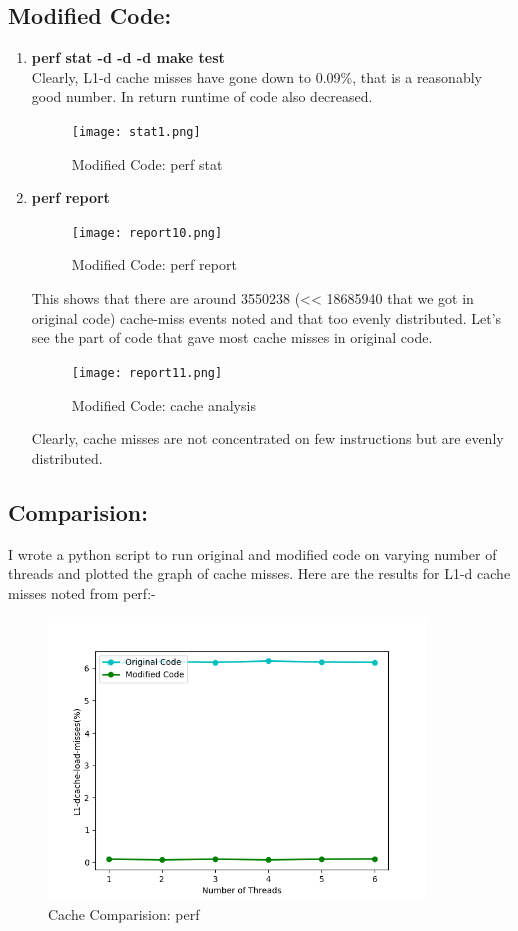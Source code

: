 \documentclass{article}
\begin{document}
\subsection{Modified Code: }
\begin{enumerate}

\item \textbf{perf stat -d -d -d make test}\\
Clearly, L1-d cache misses have gone down to 0.09\%, that is a reasonably good number. In return runtime of code also decreased. 

\begin{figure}[H]
    \centering
    \texttt{[image: stat1.png]}
    \caption{Modified Code: perf stat}
\end{figure}

\item \textbf{perf report}\\

\begin{figure}[H]
    \centering
    \texttt{[image: report10.png]}
    \caption{Modified Code: perf report}
\end{figure}
This shows that there are around 3550238 (<< 18685940 that we got in original code) cache-miss events noted and that too evenly distributed. Let's see the part of code that gave most cache misses in original code.\\

\begin{figure}[H]
    \centering
    \texttt{[image: report11.png]}
    \caption{Modified Code: cache analysis}
\end{figure}

Clearly, cache misses are not concentrated on few instructions but are evenly distributed.\\
\end{enumerate}

\subsection{Comparision: }
I wrote a python script to run original and modified code on varying number of threads and plotted the graph of cache misses. Here are the results for L1-d cache misses noted from perf:- \\
\begin{figure}[H]
    \centering
    \includegraphics[width=10cm]{cache-analysis-perf.png}
    \caption{Cache Comparision: perf}
\end{figure}
\end{document}
